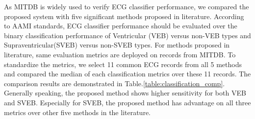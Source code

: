 \begin{table}[]
\centering
\caption{Classification Performance and Within-Set Variation of Proposed System}
\label{table:variation}
\end{table}

As MITDB is widely used to verify ECG classifier performance, we compared the proposed system with five significant methods proposed in literature. According to AAMI standards, ECG classifier performance should be evaluated over the binary classification performance of Ventricular (VEB) versus non-VEB types and Supraventricular(SVEB) versus non-SVEB types. For methods proposed in literature, same evaluation metrics are deployed on records from MITDB. To standardize the metrics, we select 11 common ECG records from all 5 methods and compared the median of each classification metrics over these 11 records. The comparison results are demonstrated in Table.\ref{table:classification_comp}. Generally speaking, the proposed method shows higher sensitivity for both VEB and SVEB. Especially for SVEB, the proposed method has advantage on all three metrics over other five methods in the literature.


